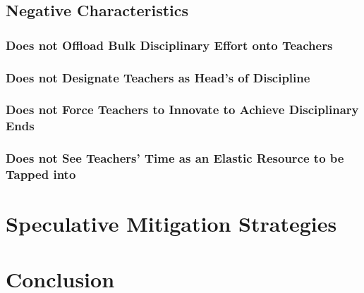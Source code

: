 \documentclass[12pt]{article}
\begin{document}
	\subsection{Negative Characteristics}
	\subsubsection{Does not Offload Bulk Disciplinary Effort onto Teachers}
	\subsubsection{Does not Designate Teachers as Head's of Discipline}
	\subsubsection{Does not Force Teachers to Innovate to Achieve Disciplinary Ends}
	\subsubsection{Does not See Teachers' Time as an Elastic Resource to be Tapped into}
	
	\section{Speculative Mitigation Strategies}
	
	\section{Conclusion}
	
	\pagebreak
	
\end{document}
